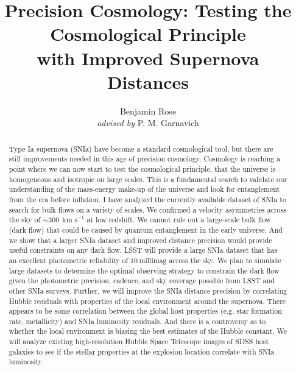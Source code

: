 \documentclass[apj, iop]{emulateapj}
\newcommand{\sn}{SNIa}
\newcommand{\kms}{\ensuremath{~\text{km s}^{-1}}}
\begin{document}
\title{Precision Cosmology: Testing the Cosmological Principle \\with Improved Supernova Distances}

\author{Benjamin Rose \\{\it advised by} P. M. Garnavich}



\begin{abstract} 

Type Ia supernova (\sn{}) have become a standard cosmological tool, but there
are still improvements needed in this age of precision cosmology. Cosmology is
reaching a point where we can now start to test the cosmological principle, that
the universe is homogeneous and isotropic on large scales. This is a fundamental
search to validate our understanding of the mass-energy make-up of the universe
and look for entanglement from the era before inflation. I have analyzed the
currently available dataset of \sn{} to search for bulk flows on a variety of
scales. We confirmed a  velocity asymmetries across the sky of $\sim 300~\kms{}$
at low redshift. We cannot rule out a large-scale bulk flow (dark flow) that
could be caused by quantum entanglement in the early universe. And we show that
a larger \sn{} dataset and improved distance precision would provide useful
constraints on any dark flow. LSST will provide a large \sn{} dataset that has
an excellent photometric reliability of $10~\text{millimag}$ across the sky. We plan to
simulate large datasets to determine the optimal observing strategy to constrain
the dark flow given the photometric precision, cadence, and sky coverage
possible from LSST and other \sn{} surveys. Further, we will improve the \sn{}
distance precision by correlating Hubble residuals with properties of the local
environment around the supernova. There appears to be some correlation between
the global host properties (e.g. star formation rate, metallicity) and \sn{}
luminosity residuals. And there is a controversy as to whether the local
environment is biasing the best estimates of the Hubble constant. We will
analyze existing high-resolution Hubble Space Telescope images of SDSS host
galaxies to see if the stellar properties at the explosion location correlate
with \sn{} luminosity.

\end{abstract}
\end{document}
